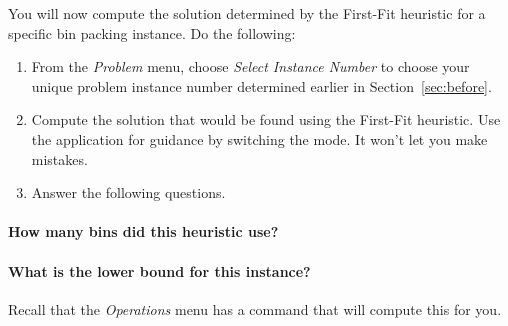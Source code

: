 \documentclass[11pt,letterpaper]{article}
\begin{document}

You will now compute the solution determined by the First-Fit
heuristic for a specific bin packing instance. Do the following:
\begin{enumerate}[leftmargin=*, parsep=0pt, itemsep=2pt, topsep=2pt, partopsep=0pt]
\item From the {\em Problem} menu, choose {\em Select Instance Number}
to choose your unique problem instance number determined earlier in 
Section~\ref{sec:before}.
\item Compute the solution that would be found using the First-Fit 
heuristic. Use the application for guidance by switching the mode.
It won't let you make mistakes.
\item Answer the following questions.
\end{enumerate}

\vspace*{-0.25in}

\paragraph*{How many bins did this heuristic use?}

\vspace*{0.25in}

\paragraph*{What is the lower bound for this instance?} Recall that the
{\em Operations} menu has a command that will compute this for you.

\vspace*{0.25in}
\end{document}
